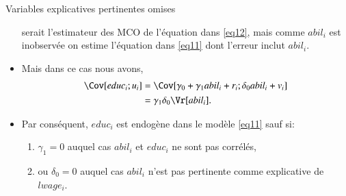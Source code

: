 \begin{frame}[allowframebreaks]{Variables explicatives pertinentes omises}
\begin{itemize}
        serait l'estimateur des MCO de l'équation dans \eqref{eq12}, mais comme $abil_i$ 
        est inobservée on estime l'équation dans \eqref{eq11} dont l'erreur inclut $abil_i$. 
        \item Mais dans ce cas nous avons, 
        \begin{align*}
            \Cov[educ_i; u_i] &= \Cov[\gamma_0 + \gamma_1abil_i + r_i; \delta_0 abil_i + v_i]\\
            &= \gamma_1\delta_0 \Vr[abil_i].
        \end{align*}
        \item Par conséquent, $educ_i$ est endogène dans le modèle \eqref{eq11} sauf si: 
        \begin{enumerate}[$\star$]
            \item $\gamma_1 = 0$ auquel cas $abil_i$ et $educ_i$ ne sont pas corrélés,
            \item ou $\delta_0 = 0$ auquel cas $abil_i$ n'est pas pertinente comme explicative de $lwage_i$.
        \end{enumerate}
    \end{itemize}

\end{frame}

